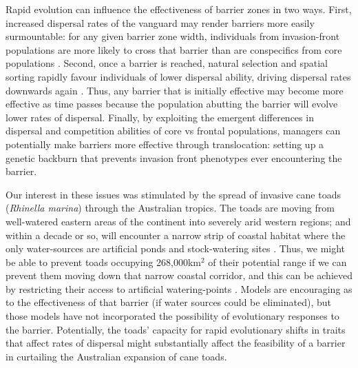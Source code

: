 \documentclass{article}
\begin{document}
Rapid evolution can influence the effectiveness of barrier zones in two ways. First, increased dispersal rates of the vanguard may render barriers more easily surmountable: for any given barrier zone width, individuals from invasion-front populations are more likely to cross that barrier than are conspecifics from core populations \citep{Travis_Smith_Ranwala_2010}. Second, once a barrier is reached, natural selection and spatial sorting rapidly favour individuals of lower dispersal ability, driving dispersal rates downwards again \citep{Kubisch_Hovestadt_Poethke_2010, Phillips_2012}.  Thus, any barrier that is initially effective may become more effective as time passes because the population abutting the barrier will evolve lower rates of dispersal.  Finally, by exploiting the emergent differences in dispersal and competition abilities of core vs frontal populations, managers can potentially make barriers more effective through translocation: setting up a genetic backburn that prevents invasion front phenotypes ever encountering the barrier. 

Our interest in these issues was stimulated by the spread of invasive cane toads (\emph{Rhinella marina}) through the Australian tropics. The toads are moving from well-watered eastern areas of the continent into severely arid western regions; and within a decade or so, will encounter a narrow strip of coastal habitat where the only water-sources are artificial ponds and stock-watering sites \citep{Florance_Webb_Dempster_Kearney_Worthing_Letnic_2011, Tingley_Phillips_Letnic_Brown_Shine_Baird_2013}. Thus, we might be able to prevent toads occupying 268,000km$^2$ of their potential range if we can prevent them moving down that narrow coastal corridor, and this can be achieved by restricting their access to artificial watering-points \citep{Tingley_Phillips_Letnic_Brown_Shine_Baird_2013, Letnic_Webb_Jessop_Florance_Dempster_2014}. Models are encouraging as to the effectiveness of that barrier (if water sources could be eliminated), but those models have not incorporated the possibility of evolutionary responses to the barrier. Potentially, the toads' capacity for rapid evolutionary shifts in traits that affect rates of dispersal \citep{Phillips_Brown_Shine_2010, Brown_2014} might substantially affect the feasibility of a barrier in curtailing the Australian expansion of cane toads.
\end{document}
